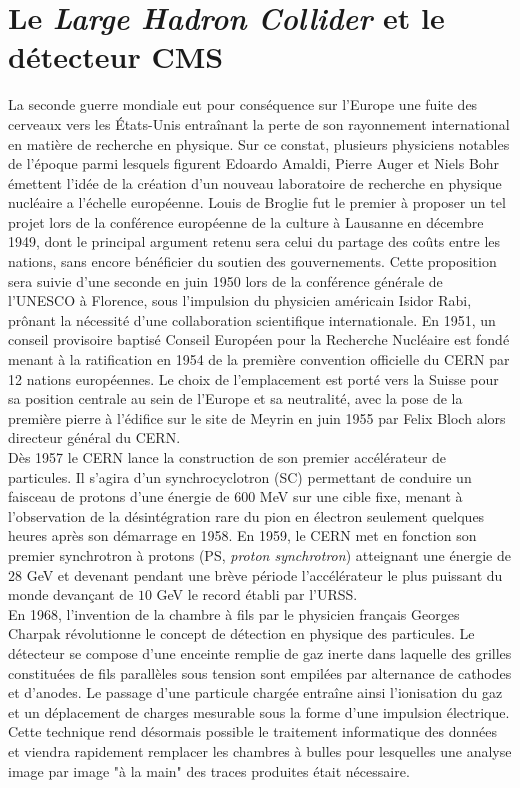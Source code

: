 \chapter{Le \textit{\uppercase{L}arge \uppercase{H}adron \uppercase{C}ollider} et le détecteur CMS}
\label{chap4}

La seconde guerre mondiale eut pour conséquence sur l'Europe une fuite des cerveaux vers les États-Unis entraînant la perte de son rayonnement international en matière de recherche en physique. Sur ce constat, plusieurs physiciens notables de l'époque parmi lesquels figurent Edoardo Amaldi, Pierre Auger et Niels Bohr émettent l'idée de la création d'un nouveau laboratoire de recherche en physique nucléaire a l'échelle européenne. Louis de Broglie fut le premier à proposer un tel projet lors de la conférence européenne de la culture à Lausanne en décembre 1949, dont le principal argument retenu sera celui du partage des coûts entre les nations, sans encore bénéficier du soutien des gouvernements. Cette proposition sera suivie d'une seconde en juin 1950 lors de la conférence générale de l'UNESCO à Florence, sous l'impulsion du physicien américain Isidor Rabi, prônant la nécessité d'une collaboration scientifique internationale. En 1951, un conseil provisoire baptisé Conseil Européen pour la Recherche Nucléaire est fondé menant à la ratification en 1954 de la première convention officielle du CERN par 12 nations européennes. Le choix de l'emplacement est porté vers la Suisse pour sa position centrale au sein de l'Europe et sa neutralité, avec la pose de la première pierre à l'édifice sur le site de Meyrin en juin 1955 par Felix Bloch alors directeur général du CERN. \\

Dès 1957 le CERN lance la construction de son premier accélérateur de particules. Il s'agira d'un synchrocyclotron (SC) permettant de conduire un faisceau de protons d'une énergie de $600$ MeV sur une cible fixe, menant à l'observation de la désintégration rare du pion en électron seulement quelques heures après son démarrage en 1958. En 1959, le CERN met en fonction son premier synchrotron à protons (PS, \textit{proton synchrotron}) atteignant une énergie de $28$ GeV et devenant pendant une brève période l'accélérateur le plus puissant du monde devançant de $10$ GeV le record  établi par l'URSS. \\

En 1968, l'invention de la chambre à fils par le physicien français Georges Charpak révolutionne le concept de détection en physique des particules. Le détecteur se compose d'une enceinte remplie de gaz inerte dans laquelle des grilles constituées de fils parallèles sous tension sont empilées par alternance de cathodes et d'anodes. Le passage d'une particule chargée entraîne ainsi l'ionisation du gaz et un déplacement de charges mesurable sous la forme d'une impulsion électrique. Cette technique rend désormais possible le traitement informatique des données et viendra rapidement remplacer les chambres à bulles pour lesquelles une analyse image par image "à la main" des traces produites était nécessaire. \\

